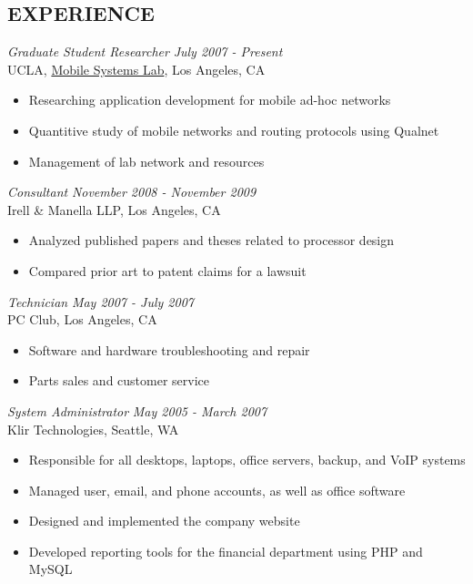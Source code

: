 \documentclass[margin]{res}
\begin{document}
\begin{resume}
 
\section{EXPERIENCE}

		{\sl Graduate Student Researcher} \hfill \textit{July 2007 - Present} \\
                UCLA, \href{http://msl.cs.ucla.edu}{Mobile Systems Lab}, Los Angeles, CA
                 \begin{itemize}  \itemsep -2pt %
                \item Researching application development for mobile ad-hoc networks
		\item Quantitive study of mobile networks and routing protocols using Qualnet
		\item Management of lab network and resources
                \end{itemize}

		{\sl Consultant} \hfill \textit{November 2008 - November 2009} \\
		Irell \& Manella LLP, Los Angeles, CA
                 \begin{itemize}  \itemsep -2pt %
                \item Analyzed published papers and theses related to processor design
		\item Compared prior art to patent claims for a lawsuit
                \end{itemize}

		{\sl Technician} \hfill \textit{May 2007 - July 2007} \\
		PC Club, Los Angeles, CA
                 \begin{itemize}  \itemsep -2pt %
                \item Software and hardware troubleshooting and repair
                \item Parts sales and customer service
                \end{itemize}

		{\sl System Administrator} \hfill \textit{May 2005 - March 2007} \\
                Klir Technologies, Seattle, WA 
                 \begin{itemize}  \itemsep -2pt %
		\item Responsible for all desktops, laptops, office servers, backup, and VoIP systems
		\item Managed user, email, and phone accounts, as well as office software
		\item Designed and implemented the company website
		\item Developed reporting tools for the financial department using PHP and MySQL
                \end{itemize}


\end{resume}
\end{document}
